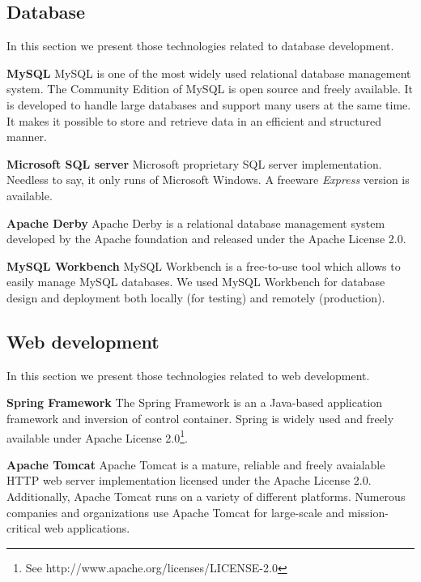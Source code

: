 \subsection{Database}
In this section we present those technologies related to database development.

\textbf{MySQL}\cite{MySQL}\newline
MySQL is one of the most widely used relational database management system.
The Community Edition of MySQL is open source and freely available.
It is developed to handle large databases and support many users at the same time.%
It makes it possible to store and retrieve data in an efficient and structured manner. 

\textbf{Microsoft SQL server}\newline
Microsoft proprietary SQL server implementation. Needless to say, it only runs of Microsoft
Windows. A freeware \textit{Express} version is available.

\textbf{Apache Derby}\newline
Apache Derby is a relational database management system developed by the Apache foundation
and released under the Apache License 2.0.

\textbf{MySQL Workbench}\newline
MySQL Workbench is a free-to-use tool which allows to easily manage MySQL databases.
We used MySQL Workbench for database design and deployment both locally (for testing) and remotely (production).


\subsection{Web development}
In this section we present those technologies related to web development.

\textbf{Spring Framework}\cite{SpringFramework1}\cite{SpringFramework2}\newline
The Spring Framework is an a Java-based application framework and inversion of control container.
Spring is widely used and freely available under Apache License 2.0\footnote{See http://www.apache.org/licenses/LICENSE-2.0}.

\textbf{Apache Tomcat}\cite{ApacheTomcat}\newline
Apache Tomcat is a mature, reliable and freely avaialable HTTP web server implementation licensed
under the Apache License 2.0. Additionally, Apache Tomcat runs on a variety of different platforms.
Numerous companies and organizations use Apache Tomcat for large-scale and mission-critical web applications.


